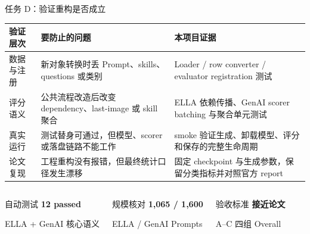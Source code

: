\documentclass[aspectratio=169,10pt]{beamer}
\newcommand{\result}[1]{\textcolor{T2IBlue}{\bfseries #1}}
\begin{document}
\begin{frame}{任务 D：验证重构是否成立}
  \begin{table}
    \centering\scriptsize
    \renewcommand{\arraystretch}{1.35}
    \begin{tabularx}{\textwidth}{p{2.25cm}X X}
      \toprule
      验证层次 & 要防止的问题 & 本项目证据 \\
      \midrule
      数据与注册 & 新对象转换时丢 Prompt、skills、questions 或类别 & Loader / row converter / evaluator registration 测试 \\
      评分语义 & 公共流程改造后改变 dependency、last-image 或 skill 聚合 & ELLA 依赖传播、GenAI scorer batching 与聚合单元测试 \\
      真实运行 & 测试替身可通过，但模型、scorer 或落盘链路不能工作 & smoke 验证生成、卸载模型、评分和保存的完整生命周期 \\
      论文复现 & 工程重构没有报错，但最终统计口径发生漂移 & 固定 checkpoint 与生成参数，保留分类指标并对照官方 report \\
      \bottomrule
    \end{tabularx}
  \end{table}

  \vspace{0.55em}
  \begin{columns}[T,onlytextwidth]
      \begin{block}{自动测试}
        \centering\small
        \result{12 passed}\par\scriptsize
        ELLA + GenAI 核心语义
      \end{block}
      \begin{block}{规模核对}
        \centering\small
        \result{1,065 / 1,600}\par\scriptsize
        ELLA / GenAI Prompts
      \end{block}
      \begin{block}{验收标准}
        \centering\small
        \textbf{接近论文}\par\scriptsize
        A--C 四组 Overall
      \end{block}
  \end{columns}
\end{frame}

\end{document}
